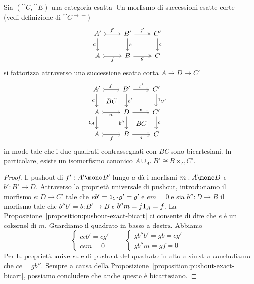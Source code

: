 \begin{proposition}\label{prop:decompose-morphisms-of-exact-sequences}
  Sia \((\cat C,\cat E)\) una categoria esatta. Un
  morfismo di successioni esatte corte (vedi definizione di \(\cat
  C^{\to\to}\))
  \[
    \begin{tikzcd}
      A' \ar["{a}", d, swap] \ar["{f'}", rightarrowtail, r] & B' \ar["{b}", d] \ar["{g'}",
      twoheadrightarrow, r] & C' \ar["{c}", d] \\
      A \ar["{f}", rightarrowtail, r, swap] & B \ar["{g}",
      twoheadrightarrow, r, swap] & C
    \end{tikzcd}
  \]
  si fattorizza attraverso una successione esatta corta \(A \to D \to C'\)
  \begin{equation}
    \begin{tikzcd}
      A' \ar["{a}", d, swap] \ar["{BC}" description, phantom, dr]
      \ar["{f'}", rightarrowtail, r] & B' \ar["{b'}", d] \ar["{g'}",
      twoheadrightarrow, r] & C' \ar["{\id_{C'}}", d] \\
      A \ar["{\id_A}", d, swap] \ar["{m}",
      rightarrowtail, r, swap] & D \ar["{b''}", d,
      swap] \ar["{BC}" description, phantom, dr] \ar["{e}", twoheadrightarrow, r] & C'
      \ar["c", d] \\
      A \ar["{f}", rightarrowtail, r, swap] & B \ar["{g}",
      twoheadrightarrow, r, swap] & C
    \end{tikzcd}
    \label{cd:decompose-morphisms-of-exact-sequences}
  \end{equation}
  in modo tale che i due quadrati contrassegnati con {\em BC}
  sono bicartesiani. In particolare, esiste un isomorfismo canonico
  \(A \cup_{A'} B' \cong B \times_{C} C'\).
\end{proposition}

\begin{proof}
  Il pushout di \(f' : A' \mono B'\) lungo \(a\) dà i morfismi
  \(m : A \mono D\) e \(b' : B' \to D\). Attraverso la proprietà
  universale di pushout, introduciamo il morfismo \(e : D \to C'\) tale
  che \(e b' = \mathtt 1_{C'} g' = g'\) e \(e m = 0\) e sia \(b'': D \to B\) il
  morfismo tale che \(b'' b' = b: B' \to B\) e \(b'' m = f \mathtt 1_A = f\). La
  Proposizione~\ref{proposition:pushout-exact-bicart} ci consente di
  dire che \(e\) è un cokernel di \(m\). Guardiamo il quadrato in basso
  a destra. Abbiamo
  \[
    \begin{cases}
      ceb' = cg' \\
      cem  = 0
    \end{cases}
    \qquad
    \begin{cases}
      gb''b' = gb = cg' \\
      gb''m = gf = 0
    \end{cases}
  \]
  Per la proprietà universale di pushout del quadrato in alto a
  sinistra concludiamo che \(ce = g b''\).  Sempre a causa della
  Proposizione~\ref{proposition:pushout-exact-bicart}, possiamo
  concludere che anche questo è bicartesiano.
\end{proof}

